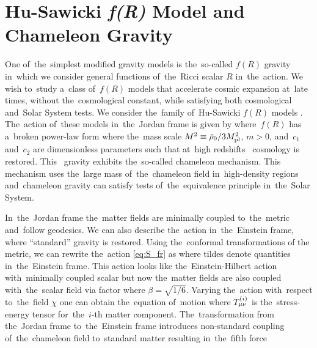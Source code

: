 \section[Chameleon Gravity]{Hu-Sawicki \texorpdfstring{\textit{\lowercase{f}(R)}}{fR} Model and Chameleon Gravity}
\label{sec_cham}
One of~the~simplest modified gravity models is the~so-called $f(R)$ gravity in~which we consider general functions of~the~Ricci scalar $R$ in~the~action. We wish to~study a~class of~$f(R)$ models that accelerate cosmic expansion at~late times, without the~cosmological constant, while satisfying both cosmological and~Solar System tests. We consider the~family of~Hu-Sawicki $f(R)$ models \parencite{Hu-Saw}. The~action of~these models in~the~Jordan frame is given by 
where~$f(R)$ has a~broken power-law form
where the~mass scale $M^2\equiv\bar\rho_0/3M_{\text{\scriptsize pl}}^2$, $m>0$, and~$c_1$ and~$c_2$ are dimensionless parameters such that at~high redshifts \LCDM\ cosmology is restored. This \fR\ gravity exhibits the~so-called chameleon mechanism. This mechanism uses the~large mass of~the~chameleon field in~high-density regions and~chameleon gravity can satisfy tests of~the~equivalence principle in~the~Solar System.

In~the~Jordan frame the~matter fields are minimally coupled to~the~metric and~follow geodesics. We can also describe the~action in~the~Einstein frame, where ``standard'' gravity is restored. Using the~conformal transformations of the metric, we can rewrite the~action \eqref{eq:S_fr} as
where tildes denote quantities in~the~Einstein frame. This action looks like the~Einstein-Hilbert action with~minimally coupled scalar but now the~matter fields are also coupled with~the~scalar field via factor
where $\beta=\sqrt{1/6}$. Varying the~action with~respect to~the~field $\chi$ one can obtain the~equation of~motion
where $T^{(i)}_{\mu\nu}$ is the~stress-energy tensor for~the~$i$-th matter component. The~transformation from the~Jordan frame to~the~Einstein frame introduces non-standard coupling of~the~chameleon field to~standard matter resulting in~the~fifth force

